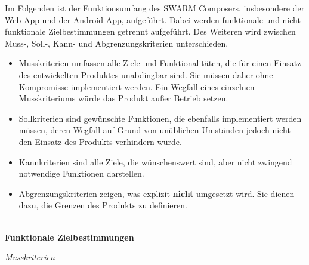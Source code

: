 Im Folgenden ist der Funktionsumfang des SWARM Composers, insbesondere der Web-App und der Android-App, aufgeführt. Dabei werden funktionale und nicht-funktionale Zielbestimmungen getrennt aufgeführt. Des Weiteren wird zwischen Muss-, Soll-, Kann- und Abgrenzungskriterien unterschieden.
%
\begin{itemize}[leftmargin=4pc]
	\item Musskriterien umfassen alle Ziele und Funktionalitäten, die für einen Einsatz des entwickelten Produktes unabdingbar sind.
	Sie müssen daher ohne Kompromisse implementiert werden. Ein Wegfall eines einzelnen Musskriteriums würde das Produkt außer Betrieb setzen.
	\item Sollkriterien sind gewünschte Funktionen, die ebenfalls implementiert werden müssen, deren Wegfall auf Grund von unüblichen Umständen jedoch nicht den Einsatz des Produkts verhindern würde.
	\item Kannkriterien sind alle Ziele, die wünschenswert sind, aber nicht zwingend notwendige Funktionen darstellen. 
	\item Abgrenzungskriterien zeigen, was explizit \textbf{nicht} umgesetzt wird. Sie dienen dazu, die Grenzen des Produkts zu definieren.
	\\\\
\end{itemize}
%

\textbf{Funktionale Zielbestimmungen}\newline
%

\textit{Musskriterien}

